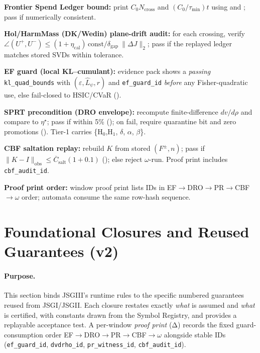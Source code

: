 \begin{acceptchecks}
\item \textbf{Frontier Spend Ledger bound:}
print $C_0 N_{\text{cross}}$ and $(C_0/\tau_{\min})t$ using
\jsgiLem{\lblJacobiDefect} and \jsgiLem{\lblNoZeno}; pass if numerically consistent.
\item \textbf{Hol/HarmMass (DK/Wedin) plane-drift audit:}
for each crossing, verify $\angle(U^+,U^-)\le (1+\eta_{\mathrm{cal}})\,\text{const}/\delta_{\text{gap}}\ \|\Delta J\|_2$; pass if the replayed ledger matches stored SVDs within tolerance.
\item \textbf{EF guard (local KL–cumulant):}
evidence pack shows a \emph{passing} \texttt{kl\_quad\_bounds} with $(\varepsilon,\hat L_\psi,r)$ and \texttt{ef\_guard\_id} \emph{before} any Fisher-quadratic use, else fail-closed to HSIC/CVaR (\jsgiiThm{\lblEFradius}).
\item \textbf{SPRT precondition (DRO envelope):}
recompute finite-difference $dv/d\rho$ and compare to $\eta^\star$; pass if within 5\% (\jsgiiThm{\lblDROenv}); on fail, require quarantine bit and zero promotions (\jsgiiDef{\lblQuarantine}). Tier-1 carries \{H$_0$,H$_1$, $\delta$, $\alpha$, $\beta$\}.
\item \textbf{CBF saltation replay:}
rebuild $K$ from stored $(F^\pm,n)$; pass if $\|K-I\|_{\text{obs}}\le \overline C_{\text{salt}}(1+0.1)$ (\jsgiiLem{\lblSaltation}); else reject $\omega$-run. Proof print includes \texttt{cbf\_audit\_id}.
\item \textbf{Proof print order:} window proof print lists IDs in EF$\rightarrow$DRO$\rightarrow$PR$\rightarrow$CBF$\rightarrow\omega$ order; automata consume the same row-hash sequence.
\end{acceptchecks}

\section{Foundational Closures and Reused Guarantees (v2)}\label{sec:closures-v2}

\paragraph{Purpose.}
This section binds JSGIII’s runtime rules to the specific numbered guarantees reused from JSGI/JSGII. Each closure restates exactly \emph{what} is assumed and \emph{what} is certified, with constants drawn from the Symbol Registry, and provides a replayable acceptance test. A per-window \emph{proof print} (Δ) records the fixed guard-consumption order EF$\rightarrow$DRO$\rightarrow$PR$\rightarrow$CBF$\rightarrow\omega$ alongside stable IDs (\texttt{ef\_guard\_id}, \texttt{dvdrho\_id}, \texttt{pr\_witness\_id}, \texttt{cbf\_audit\_id}).



